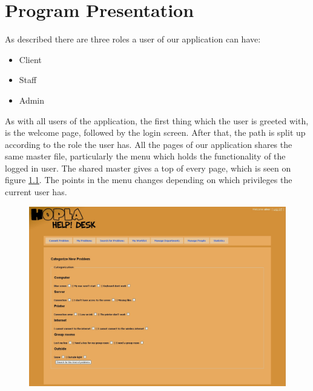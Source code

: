 \chapter{Program Presentation}
\label{chap:program_presentation}

As described there are three roles a user of our application can have:

\begin{itemize}
	\item Client
	\item Staff
	\item Admin
\end{itemize}

As with all users of the application, the first thing which the user is greeted with, is the welcome page, followed by the login screen.
After that, the path is split up according to the role the user has.
All the pages of our application shares the same master file, particularly the menu which holds the functionality of the logged in user.
The shared master gives a top of every page, which is seen on figure \ref{fig:master}.
The points in the menu changes depending on which privileges the current user has.

\begin{figure}[H]
	\centering
		\includegraphics[width=1.00\textwidth, clip=true, trim=0cm 27.5cm 0cm 0cm]{input/implementation/program_presentation/commit.png}
	\label{fig:master}
\end{figure}

